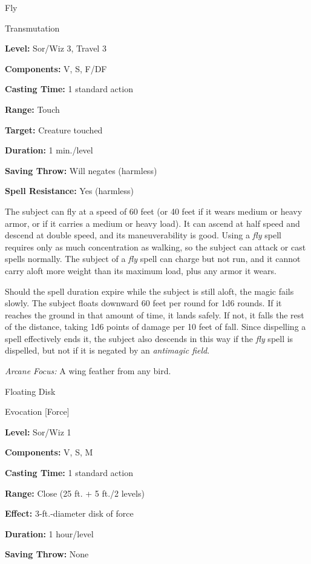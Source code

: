 \documentclass{article}
\begin{document}
\vspace{12pt}
Fly

Transmutation

\textbf{Level:} Sor/Wiz 3, Travel 3

\textbf{Components:} V, S, F/DF

\textbf{Casting Time:} 1 standard action

\textbf{Range:} Touch

\textbf{Target:} Creature touched

\textbf{Duration:} 1 min./level

\textbf{Saving Throw:} Will negates (harmless)

\textbf{Spell Resistance:} Yes (harmless)

The subject can fly at a speed of 60 feet (or 40 feet if it wears medium or heavy 
armor, or if it carries a medium or heavy load). It can ascend at half speed and 
descend at double speed, and its maneuverability is good. Using a \textit{fly }spell 
requires only as much concentration as walking, so the subject can attack or cast 
spells normally. The subject of a \textit{fly }spell can charge but not run, and 
it cannot carry aloft more weight than its maximum load, plus any armor it wears.

Should the spell duration expire while the subject is still aloft, the magic fails 
slowly. The subject floats downward 60 feet per round for 1d6 rounds. If it reaches 
the ground in that amount of time, it lands safely. If not, it falls the rest of 
the distance, taking 1d6 points of damage per 10 feet of fall. Since dispelling 
a spell effectively ends it, the subject also descends in this way if the \textit{fly 
}spell is dispelled, but not if it is negated by an \textit{antimagic field}.

\textit{Arcane Focus: }A wing feather from any bird.

\vspace{12pt}
Floating Disk

Evocation [Force]

\textbf{Level:} Sor/Wiz 1

\textbf{Components:} V, S, M

\textbf{Casting Time:} 1 standard action

\textbf{Range:} Close (25 ft. + 5 ft./2 levels)

\textbf{Effect:} 3-ft.-diameter disk of force

\textbf{Duration:} 1 hour/level

\textbf{Saving Throw:} None
\end{document}

